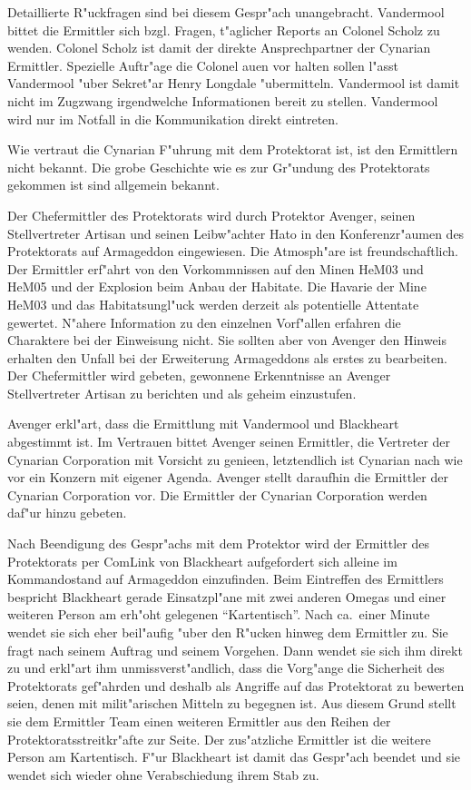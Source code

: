 \begin{remarks}	
	Detaillierte R"uckfragen sind bei diesem Gespr"ach unangebracht. Vandermool bittet die Ermittler sich bzgl. Fragen, t"aglicher Reports an Colonel Scholz zu wenden. Colonel Scholz ist damit der direkte Ansprechpartner der Cynarian Ermittler. Spezielle Auftr"age die Colonel au\3en vor halten sollen l"asst Vandermool "uber Sekret"ar Henry Longdale "ubermitteln. Vandermool ist damit nicht im Zugzwang irgendwelche Informationen bereit zu stellen. Vandermool wird nur im Notfall in die Kommunikation direkt eintreten.

	Wie vertraut die Cynarian F"uhrung mit dem Protektorat ist, ist den Ermittlern nicht bekannt. Die grobe Geschichte  wie es zur Gr"undung des Protektorats gekommen ist sind allgemein bekannt.

\end{remarks}



Der Chefermittler des Protektorats wird durch Protektor Avenger, seinen Stellvertreter Artisan und seinen Leibw"achter Hato in den Konferenzr"aumen des Protektorats auf Armageddon eingewiesen. Die Atmosph"are ist freundschaftlich. Der Ermittler erf"ahrt von den Vorkommnissen auf den Minen HeM03 und HeM05 und der Explosion beim Anbau der Habitate. Die Havarie der Mine HeM03 und das Habitatsungl"uck werden derzeit als potentielle Attentate gewertet. N"ahere Information zu den einzelnen Vorf"allen erfahren die Charaktere bei der Einweisung nicht. Sie sollten aber von Avenger den Hinweis erhalten den Unfall bei der Erweiterung Armageddons als erstes zu bearbeiten. Der Chefermittler wird gebeten, gewonnene Erkenntnisse an Avenger Stellvertreter Artisan zu berichten und als geheim einzustufen.

Avenger erkl"art, dass die Ermittlung mit Vandermool und Blackheart abgestimmt ist. Im Vertrauen bittet Avenger seinen Ermittler, die Vertreter der Cynarian Corporation mit Vorsicht zu genie\3en, letztendlich ist Cynarian nach wie vor ein Konzern mit eigener Agenda. Avenger stellt daraufhin die Ermittler der Cynarian Corporation vor. Die Ermittler der Cynarian Corporation werden daf"ur hinzu gebeten.

Nach Beendigung des Gespr"achs mit dem Protektor wird der Ermittler des Protektorats per ComLink von Blackheart aufgefordert sich alleine im Kommandostand auf Armageddon einzufinden. Beim Eintreffen des Ermittlers bespricht Blackheart gerade Einsatzpl"ane mit zwei anderen Omegas und einer weiteren Person am erh"oht gelegenen "`Kartentisch"'. Nach ca.~einer Minute  wendet sie sich eher beil"aufig "uber den R"ucken hinweg dem Ermittler zu. Sie fragt nach seinem Auftrag und seinem Vorgehen. Dann wendet sie sich ihm direkt zu und erkl"art ihm unmissverst"andlich, dass die Vorg"ange die Sicherheit des Protektorats gef"ahrden und deshalb als Angriffe auf das Protektorat zu bewerten seien, denen mit milit"arischen Mitteln zu begegnen ist. Aus diesem Grund stellt sie dem Ermittler Team einen weiteren Ermittler aus den Reihen der Protektoratsstreitkr"afte zur Seite. Der zus"atzliche Ermittler ist die weitere Person am Kartentisch. F"ur Blackheart ist damit das Gespr"ach beendet und sie wendet sich wieder ohne Verabschiedung ihrem Stab zu.

